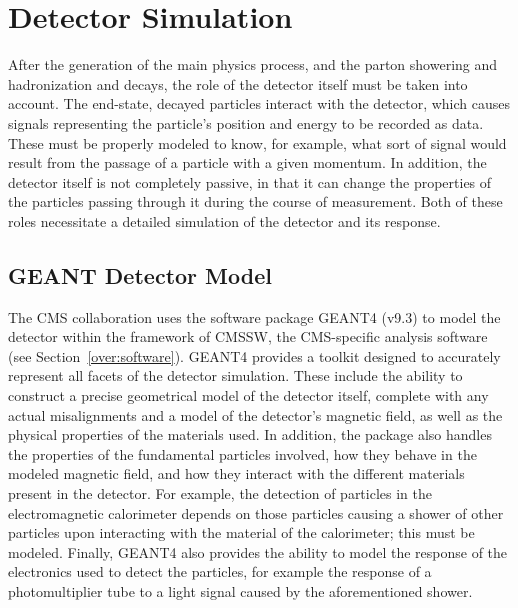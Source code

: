 \section{Detector Simulation}
\label{sim:Detector}

After the generation of the main physics process, 
and the parton showering and hadronization and decays, 
the role of the detector itself must be taken into account.  
The end-state, decayed particles interact with 
the detector, which causes signals representing 
the particle's position and energy to be recorded as data.  
These must be properly modeled to know, for example, 
what sort of signal would result from the passage of a particle 
with a given momentum.  
In addition, the detector itself is not completely passive, 
in that it can change the properties of the 
particles passing through it during the course of measurement.  
Both of these roles necessitate a detailed simulation 
of the detector and its response.  


\subsection{GEANT Detector Model}
\label{sim:DetectorGeant}



The CMS collaboration uses the software package 
GEANT4 (v9.3) \cite{GEANT4} to model the detector 
within the framework of CMSSW, 
the CMS-specific analysis software 
(see Section~\ref{over:software}).  
GEANT4 provides a toolkit designed 
to accurately represent all facets of 
the detector simulation.  
These include the ability to construct 
a precise geometrical model of the 
detector itself, 
complete with any actual misalignments 
and a model of the detector's magnetic field, 
as well as the physical properties 
of the materials used.  
In addition, the package also handles 
the properties of the 
fundamental particles involved, 
how they behave in the modeled 
magnetic field, 
and how they interact with the different 
materials present in the detector.  
For example, the detection of particles 
in the electromagnetic calorimeter 
depends on those particles causing 
a shower of other particles upon 
interacting with the material of the 
calorimeter; 
this must be modeled.  
Finally, GEANT4 also provides 
the ability to model the response of 
the electronics used to detect the particles, 
for example the response of a photomultiplier tube 
to a light signal caused by the aforementioned shower.  

